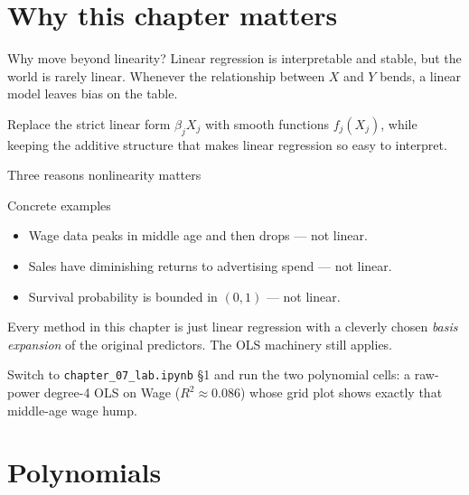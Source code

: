 \documentclass[aspectratio=169,11pt]{beamer}
\begin{document}
\section{Why this chapter matters}

\begin{frame}{Why move beyond linearity?}
  Linear regression is interpretable and stable, but the world is
  rarely linear. Whenever the relationship between $X$ and $Y$ bends,
  a linear model leaves bias on the table.
  \begin{takeaway}
    Replace the strict linear form $\beta_j X_j$ with smooth functions
    $f_j(X_j)$, while keeping the additive structure that makes linear
    regression so easy to interpret.
  \end{takeaway}
\end{frame}

\begin{frame}{Three reasons nonlinearity matters}
  \begin{block}{Concrete examples}
    \begin{itemize}
      \item Wage data peaks in middle age and then drops --- not linear.
      \item Sales have diminishing returns to advertising spend --- not
            linear.
      \item Survival probability is bounded in $(0,1)$ --- not linear.
    \end{itemize}
  \end{block}
  \begin{takeaway}
    Every method in this chapter is just linear regression with a
    cleverly chosen \emph{basis expansion} of the original predictors.
    The OLS machinery still applies.
  \end{takeaway}
  \begin{labnote}
    Switch to \texttt{chapter\_07\_lab.ipynb} \S1 and run the two polynomial cells: a raw-power degree-4 OLS on Wage ($R^2\approx0.086$) whose grid plot shows exactly that middle-age wage hump.
  \end{labnote}
\end{frame}



\section{Polynomials}
\end{document}
